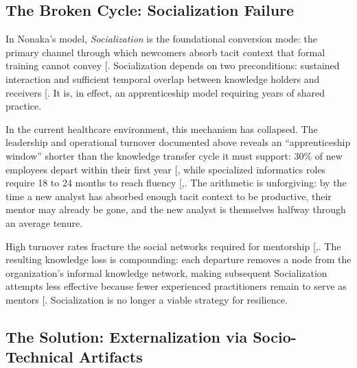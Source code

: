 \documentclass[
  american,
  11pt,
  letterpaper,
  oneside  ,captions=tableheading
]{scrartcl}
\begin{document}
\subsection{The Broken Cycle: Socialization
Failure}\label{the-broken-cycle-socialization-failure}

In Nonaka's model, \emph{Socialization} is the foundational conversion
mode: the primary channel through which newcomers absorb tacit context
that formal training cannot convey {[}\citeproc{ref-farnese2019}{16}{]}.
Socialization depends on two preconditions: sustained interaction and
sufficient temporal overlap between knowledge holders and receivers
{[}\citeproc{ref-foos2006}{18}{]}. It is, in effect, an apprenticeship
model requiring years of shared practice.

In the current healthcare environment, this mechanism has collapsed. The
leadership and operational turnover documented above reveals an
``apprenticeship window'' shorter than the knowledge transfer cycle it
must support: 30\% of new employees depart within their first year
{[}\citeproc{ref-nsi2025}{19}{]}, while specialized informatics roles
require 18 to 24 months to reach fluency
{[},\citeproc{ref-konrad2022}{20}{]}. The
arithmetic is unforgiving: by the time a new analyst has absorbed enough
tacit context to be productive, their mentor may already be gone, and
the new analyst is themselves halfway through an average tenure.

High turnover rates fracture the social networks required for mentorship
{[},\citeproc{ref-ren2024}{22}{]}. The
resulting knowledge loss is compounding: each departure removes a node
from the organization's informal knowledge network, making subsequent
Socialization attempts less effective because fewer experienced
practitioners remain to serve as mentors
{[}\citeproc{ref-massingham2018}{23}{]}. Socialization is no longer a
viable strategy for resilience.

\subsection{The Solution: Externalization via Socio-Technical
Artifacts}\label{the-solution-externalization-via-socio-technical-artifacts}
\end{document}
